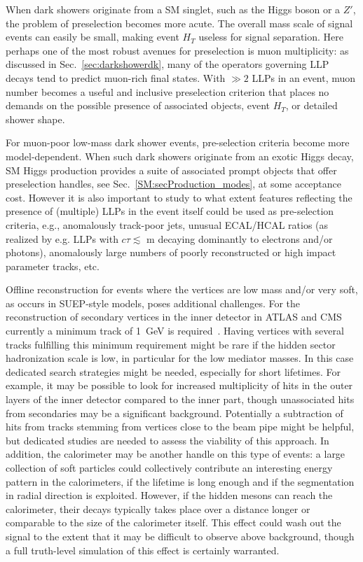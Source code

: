When dark showers originate from a SM singlet, such as the Higgs boson or a $Z'$, the problem of preselection becomes more acute. The overall mass scale of signal events can easily be small, making event $H_T$ useless for signal separation.   Here perhaps one of the most robust avenues for preselection is muon multiplicity: as discussed in Sec.~\ref{sec:darkshowerdk}, many of the operators governing LLP decays tend to predict muon-rich final states.  With $\gg 2$ LLPs in an event, muon number becomes a useful and inclusive preselection criterion that places no demands on the possible presence of associated objects, event $H_T$, or detailed shower shape.

For muon-poor low-mass dark shower events, pre-selection criteria become more model-dependent. When such dark showers originate from an exotic Higgs decay, SM Higgs production provides a suite of associated prompt objects that offer preselection handles, see Sec.~\ref{SM:secProduction_modes}, at some acceptance cost.   However it is also important to study to what extent features reflecting the presence of (multiple) LLPs in the event itself could be used as pre-selection criteria, e.g., anomalously track-poor jets, unusual ECAL/HCAL ratios (as realized by e.g. LLPs with $c\tau \lesssim$ m decaying dominantly to electrons and/or photons), anomalously large numbers of poorly reconstructed or high impact parameter tracks, etc.

Offline reconstruction for events where the vertices are low mass and/or very soft, as occurs in SUEP-style models, poses additional challenges. For the reconstruction of secondary vertices in the inner detector in ATLAS and CMS currently a minimum track \pt of 1~GeV is required~\cite{Aaboud:2017iio,Chatrchyan:2012jua}. Having vertices with several tracks fulfilling this minimum \pt requirement might be rare if the hidden sector hadronization scale is low, in particular for the low mediator masses. In this case dedicated search strategies might be needed, especially for short lifetimes. For example, it may be possible to look for increased multiplicity of hits in the outer layers of the inner detector compared to the inner part, though unassociated hits from secondaries may be a significant background. Potentially a subtraction of hits from tracks stemming from vertices close to the beam pipe might be helpful, but dedicated studies are needed to assess the viability of this approach.
In addition, the calorimeter may be another handle on this type of events: a large collection of soft particles could collectively contribute an interesting energy pattern in the calorimeters, if the lifetime is long enough and if the segmentation in radial direction is exploited. However, if the hidden mesons can reach the calorimeter, their decays typically takes place over a distance longer or comparable to the size of the calorimeter itself. This effect could wash out the signal to the extent that it may be difficult to observe above background, though a full truth-level simulation of this effect is certainly warranted.


